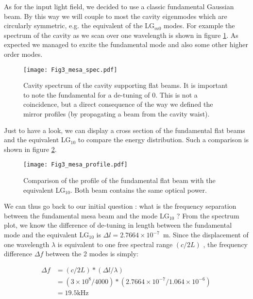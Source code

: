 As for the input light field, we decided to use a classic fundamental Gaussian beam. By this way we will couple to most the cavity eigenmodes which are circularly symmetric, e.g. the equivalent of the LG$_{m0}$ modes. For example the spectrum of the cavity as we scan over one wavelength is shown in figure \ref{fig3_mesa_spec}. As expected we managed to excite the fundamental mode and also some other higher order modes.

\begin{figure}
\begin{center}
\texttt{[image: Fig3\_mesa\_spec.pdf]}
\end{center}
\caption{Cavity spectrum of the cavity supporting flat beams. It is important to note the fundamental for a de-tuning of 0. This is not a coincidence, but a direct consequence of the way we defined the mirror profiles (by propagating a beam from the cavity waist).\label{fig3_mesa_spec}}
\end{figure}

Just to have a look, we can display a cross section of the fundamental flat beams and the equivalent LG$_{10}$ to compare the energy distribution. Such a comparison is shown in figure \ref{fig3_mesa_profile}.\\

\begin{figure}
\begin{center}
\texttt{[image: Fig3\_mesa\_profile.pdf]}
\end{center}
\caption{Comparison of the profile of the fundamental flat beam with the equivalent LG$_{10}$. Both beam contains the same optical power.\label{fig3_mesa_profile}}
\end{figure}

We can thus go back to our initial question : what is the frequency separation between the fundamental mesa beam and the mode LG$_{10}$ ? From the spectrum plot, we know the difference of de-tuning in length between the fundamental mode and the equivalent LG$_{10}$ is $ \Delta l = 2.7664 \times 10^{-7}$~m. Since the displacement of one wavelength $\lambda$ is equivalent to one free spectral range $(c / 2L)$ , the frequency difference $\Delta f$ between the 2 modes is simply:

\begin{equation}
\begin{split}
\Delta f & = (c / 2L) * (\Delta l / \lambda)\\
& = (3 \times 10^8/4000)*( 2.7664 \times 10^{-7} / 1.064 \times 10^{-6}) \\
& = 19.5 \textrm{kHz}
\end{split}
\end{equation}

